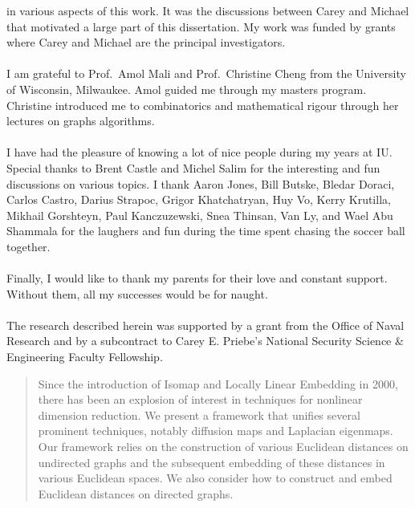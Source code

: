 \documentclass[12pt,reqno,final,ugsabstract,ugsabstractsigs]{iuthesis}
\theoremstyle{definition}
\numberwithin{equation}{chapter}
\numberwithin{section}{chapter}
\begin{document}
\begin{acknowledgements}
  in various aspects of this work. It was the discussions between Carey
  and Michael that motivated a large part of this dissertation. My
  work was funded by grants where Carey and Michael are the principal investigators. \\
  \\
%
  \noindent I am grateful to Prof.~Amol Mali and Prof.~Christine Cheng
  from the University of Wisconsin, Milwaukee. Amol guided me through
  my masters program. Christine introduced me to combinatorics and
  mathematical rigour through her lectures on graphs algorithms. \\ \\
%
  \noindent I have had the pleasure of knowing a lot of nice people
  during my years at IU\@. Special thanks to Brent Castle and Michel
  Salim for the interesting and fun discussions on various topics. I
  thank Aaron Jones, Bill Butske, Bledar Doraci, Carlos Castro, Darius
  Strapoc, Grigor Khatchatryan, Huy Vo, Kerry Krutilla, Mikhail
  Gorshteyn, Paul Kanczuzewski, Snea Thinsan, Van Ly, and Wael Abu
  Shammala for the laughers and fun during the time spent chasing the
  soccer ball together. \\ \\
%
  \noindent Finally, I would like to thank my parents for their love
  and constant support. Without them, all my successes would be for
  naught. \\ \\
%
  \noindent The research described herein was supported by a grant
  from the Office of Naval Research and by a subcontract to Carey
  E. Priebe's National Security Science \& Engineering Faculty
  Fellowship.
\end{acknowledgements}
\begin{abstract}
  Since the introduction of Isomap and
  Locally Linear Embedding in 2000, there has
  been an explosion of interest in techniques for nonlinear dimension
  reduction.  We present a framework that unifies several prominent
  techniques, notably diffusion maps and Laplacian
  eigenmaps.  Our framework relies on the construction of various
  Euclidean distances on undirected graphs and the subsequent
  embedding of these distances in various Euclidean spaces.  We also
  consider how to construct and embed Euclidean distances on directed
  graphs.
\end{abstract}
\frontmatter
\maketitle
\signaturepage
\makeack
\makeabstract
\tableofcontents
\mainmatter
%





\appendix



\newpage
\thispagestyle{empty}
\pagestyle{empty}
\end{document}
